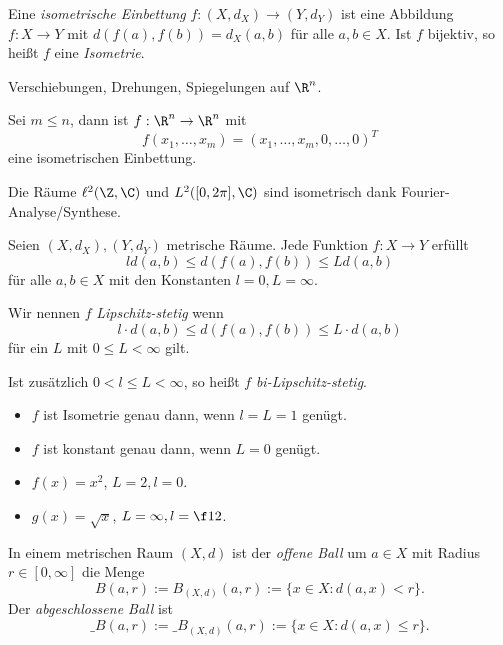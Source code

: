\begin{df}
	Eine \emph{isometrische Einbettung} $f:(X,d_X) \to (Y,d_Y)$ ist eine Abbildung $f: X\to Y$ mit $d(f(a), f(b)) = d_X(a,b)$ für alle $a,b \in X$.
	Ist $f$ bijektiv, so heißt $f$ eine \emph{Isometrie}.
\end{df}

\begin{ex}
	Verschiebungen, Drehungen, Spiegelungen auf $\R^n$.
\end{ex}

\begin{ex}
	Sei $m \le n$, dann ist	$f: \R^n \to \R^n$ mit
	\[
		f(x_1, \dotsc, x_m) = (x_1, \dotsc, x_m, 0, \dotsc, 0)^T
	\]
	eine isometrischen Einbettung.
\end{ex}

\begin{ex}
	Die Räume $\ell^2(\Z, \C)$ und $L^2([0,2\pi], \C)$ sind isometrisch dank Fourier-Analyse/Synthese.
\end{ex}

Seien $(X,d_X), (Y,d_Y)$ metrische Räume.
Jede Funktion $f : X \to Y$ erfüllt
\[
	l d(a,b) \le d(f(a), f(b)) \le L d(a,b)
\]
für alle $a,b \in X$ mit den Konstanten $l=0, L = \infty$.

\begin{df}
	Wir nennen $f$ \emph{Lipschitz-stetig} wenn
	\[
		l \cdot d(a,b) \le d(f(a), f(b)) \le L \cdot d(a,b)
	\]
	für ein $L$ mit $0 \le L < \infty$ gilt.

	Ist zusätzlich $0 < l \le L < \infty$, so heißt $f$ \emph{bi-Lipschitz-stetig}.
\end{df}

\begin{ex}
	\begin{itemize}
		\item
			$f$ ist Isometrie genau dann, wenn $l=L=1$ genügt.
		\item
			$f$ ist konstant genau dann, wenn $L=0$ genügt.
	\end{itemize}
\end{ex}

\begin{ex}
	\begin{itemize}
		\item
			$f(x) = x^2$, $L=2, l=0$.
		\item
			$g(x) = \sqrt{x}$, $L=\infty, l=\f 12$.
	\end{itemize}
\end{ex}

\begin{df}
	In einem metrischen Raum $(X,d)$ ist der \emph{offene Ball} um $a \in X$ mit Radius $r\in [0,\infty]$ die Menge
	\[
		B(a,r) := B_{(X,d)}(a, r) := \{ x \in X : d(a,x) < r \}.
	\]
	Der \emph{abgeschlossene Ball} ist
	\[
		\_{B}(a,r) := \_{B}_{(X,d)}(a, r) := \{ x \in X : d(a,x) \le r \}.
	\]
\end{df}

